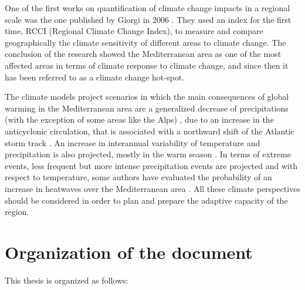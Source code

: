 One of the first works on quantification of climate change impacts in a regional scale was the one published by Giorgi in 2006 \cite*{Giorgi2006}. They used an index for the first time, RCCI (Regional Climate Change Index), to measure and compare geographically the climate sensitivity of different areas to climate change. The conclusion of the research showed the Mediterranean area as one of the most affected areas in terms of climate response to climate change, and since then it has been referred to as a climate change hot-spot.


The climate models project scenarios in which the main consequences of global warming in the Mediterranean area are a generalized decrease of precipitations (with the exception of some areas like the Alps) \cite*{Giorgi2016}, due to an increase in the anticyclonic circulation, that is associated with a northward shift of the Atlantic storm track \cite*{Yin2005}. An increase in interannual variability of temperature and precipitation is also projected, mostly in the warm season \cite*{Giorgi2008, Planton2012}. In terms of extreme events, less frequent but more intense precipitation events are projected \cite*{Drobinski} and with respect to temperature, some authors have evaluated the probability of an increase in heatwaves over the Mediterranean area \cite*{meehl2004, Fischer2010}. All these climate perspectives should be considered in order to plan and prepare the adaptive capacity of the region.\\   

\section{Organization of the document}%

This thesis is organized as follows:

